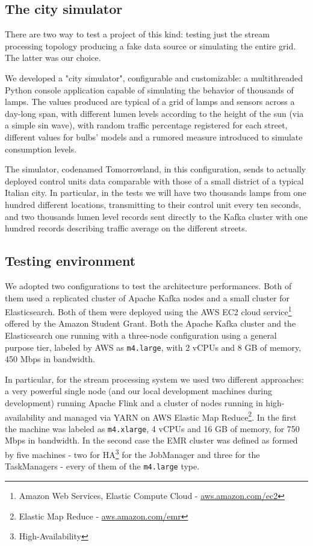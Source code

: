 \subsection{The city simulator}
There are two way to test a project of this kind: testing just the stream processing topology producing a fake data source or simulating the entire grid. The latter was our choice.

We developed a "city simulator", configurable and customizable: a multithreaded Python console application capable of simulating the behavior of thousands of lamps. The values produced are typical of a grid of lamps and sensors across a day-long span, with different lumen levels according to the height of the sun (via a simple sin wave), with random traffic percentage registered for each street, different values for bulbs' models and a rumored measure introduced to simulate consumption levels.

The simulator, codenamed Tomorrowland, in this configuration, sends to actually deployed control units data comparable with those of a small district of a typical Italian city. In particular, in the tests we will have two thousands lamps from one hundred different locations, transmitting to their control unit every ten seconds, and two thousands lumen level records sent directly to the Kafka cluster with one hundred records describing traffic average on the different streets. 

\subsection{Testing environment}
We adopted two configurations to test the architecture performances. Both of them used a replicated cluster of Apache Kafka nodes and a small cluster for Elasticsearch. Both of them were deployed using the AWS EC2 cloud service\footnote{Amazon Web Services, Elastic Compute Cloud - \url{aws.amazon.com/ec2}} offered by the Amazon Student Grant. Both the Apache Kafka cluster and the Elasticsearch one running with a three-node configuration using a general purpose tier, labeled by AWS as \texttt{m4.large}, with 2 vCPUs and 8 GB of memory, 450 Mbps in bandwidth. 

In particular, for the stream processing system we used two different approaches: a very powerful single node (and our local development machines during development) running Apache Flink and a cluster of nodes running in high-availability and managed via YARN on AWS Elastic Map Reduce\footnote{Elastic Map Reduce - \url{aws.amazon.com/emr}}. In the first the machine was labeled as \texttt{m4.xlarge}, 4 vCPUs and 16 GB of memory, for 750 Mbps in bandwidth. In the second case the EMR cluster was defined as formed by five machines - two for HA\footnote{High-Availability} for the JobManager and three for the TaskManagers -  every of them of the \texttt{m4.large} type.

